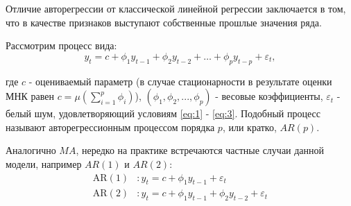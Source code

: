 Отличие авторегрессии от классической линейной регрессии заключается в том, 
что в качестве \guillemotleft признаков\guillemotright {} выступают 
собственные прошлые значения ряда.

Рассмотрим процесс вида:
\begin{equation*}
    y_t = c + \phi_1 y_{t-1} + \phi_2 y_{t-2} + \dots + \phi_p y_{t-p} + \varepsilon_t,
\end{equation*}

где $c$ - оцениваемый параметр (в случае стационарности в результате оценки МНК равен 
$c = \mu (\sum_{i=1}^p \phi_i)$), 
$(\phi_1, \phi_2, ..., \phi_p)$ - весовые коэффициенты, $\varepsilon_t$ - 
белый шум, удовлетворяющий условиям \eqref{eq:1} - \eqref{eq:3}. Подобный процесс 
называют авторегрессионным процессом порядка $p$, или кратко, $AR(p)$.

Аналогично $MA$, нередко на практике встречаются частные случаи данной модели, например $AR(1)$ и 
$AR(2)$:
\begin{align*}
    \text{AR}(1) &: y_t = c + \phi_1 y_{t-1} + \varepsilon_t \\
    \text{AR}(2) &: y_t = c + \phi_1 y_{t-1} + \phi_2 y_{t-2} + \varepsilon_t
\end{align*}





